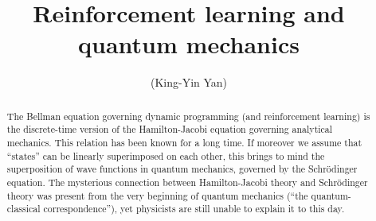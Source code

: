 \documentclass[orivec]{llncs}
\title{Reinforcement learning and quantum mechanics}
\author{\usebox{\MyName} (King-Yin Yan)
}
\institute{General.Intelligence@Gmail.com}
\begin{document}
\maketitle

\setlength{\parindent}{0em}
\setlength{\parskip}{2.8ex plus0.8ex minus0.8ex}

\begin{abstract}
	The Bellman equation governing dynamic programming (and reinforcement learning) is the discrete-time version of the Hamilton-Jacobi equation governing analytical mechanics.  This relation has been known for a long time.  If moreover we assume that ``states'' can be linearly superimposed on each other, this brings to mind the superposition of wave functions in quantum mechanics, governed by the Schr\"odinger equation.  The mysterious connection between Hamilton-Jacobi theory and Schr\"odinger theory was present from the very beginning of quantum mechanics (``the quantum-classical correspondence''), yet physicists are still unable to explain it to this day.
\end{abstract}
\end{document}
